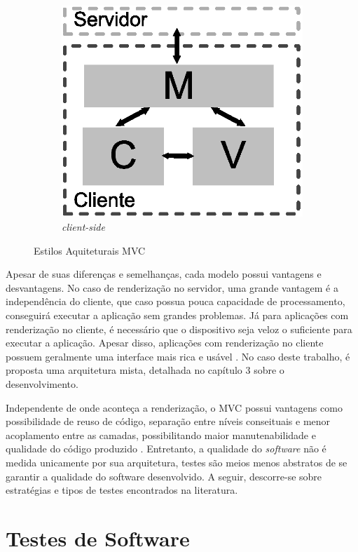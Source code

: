 \begin{figure}[h!]
\begin{subfigure}{.31\textwidth}
  		\centering
  		\includegraphics[width=.9\linewidth]{figuras/cliente.eps}
  		\caption{ \textit{client-side}}
  		\label{fig:submvc3}
	\end{subfigure}
	\caption{Estilos Aquiteturais MVC}
	\label{fig:mvc}
\end{figure}

Apesar de suas diferenças e semelhanças, cada modelo possui vantagens e desvantagens. No caso de renderização no servidor, uma grande vantagem é a independência do cliente, que caso possua pouca capacidade de processamento, conseguirá executar a aplicação sem grandes problemas. Já para aplicações com renderização no cliente, é necessário que o dispositivo seja veloz o suficiente para executar a aplicação. Apesar disso, aplicações com renderização no cliente possuem geralmente uma interface mais rica e usável \cite{Ubl2015}. No caso deste trabalho, é proposta uma arquitetura mista, detalhada no capítulo 3 sobre o desenvolvimento.

Independente de onde aconteça a renderização, o MVC possui vantagens como possibilidade de reuso de código, separação entre níveis conseituais e menor acoplamento entre as camadas, possibilitando maior manutenabilidade e qualidade do código produzido \cite{krasner1988}. Entretanto, a qualidade do \textit{software} não é medida unicamente por sua arquitetura, testes são meios menos abstratos de se garantir a qualidade do software desenvolvido. A seguir, descorre-se sobre estratégias e tipos de testes encontrados na literatura.

\section{Testes de Software}

